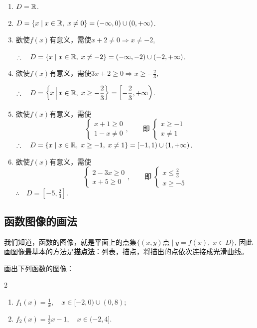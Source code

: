\begin{solution}    
\begin{enumerate}[(1)]
    \item $D=\mathbb{R}$.
    \item $D=\{x\mid x\in\mathbb{R},\; x\ne 0\}=(-\infty,0)\cup(0,+\infty)$.
    \item 欲使$f(x)$有意义，需使$x+2\ne 0\Longrightarrow x\ne -2$,
    
$\therefore\quad D=\{x\mid x\in\mathbb{R},\; x\ne -2\}=(-\infty,-2)\cup(-2,+\infty)$.

\item 欲使$f(x)$有意义，需使$3x+2\ge 0\Longrightarrow x\ge -\frac{2}{3}$,
    
$\therefore\quad D=\left\{x\, \Big|\, x\in\mathbb{R},\; x\ge -\dfrac{2}{3}\right\}=\left[-\dfrac{2}{3},+\infty\right)$.

\item 欲使$f(x)$有意义，需使
\[\begin{cases}
    x+1\ge 0\\
    1-x\ne 0
\end{cases},\qquad \text{即}\; \begin{cases}
    x\ge -1\\x\ne 1
\end{cases}\]
$\therefore\quad D=\{x\mid x\in\mathbb{R},\; x\ge -1,\; x\ne 1\}=[-1,1)\cup(1,+\infty)$.
\item 欲使$f(x)$有意义，需使
\[\begin{cases}
    2-3x\ge 0\\
    x+5\ge 0
\end{cases},\qquad \text{即}\; \begin{cases}
    x\le \frac{2}{3}\\x\ge -5
\end{cases}\]
$\therefore\quad D=\left[-5,\frac{2}{3}\right]$.
\end{enumerate}
\end{solution}    

\subsection{函数图像的画法}
我们知道，函数的图像，就是平面上的点集$\{(x,y) \text{点}\mid y=f(x),\; x\in D\}$, 因此画图像最基本的方法是\textbf{描点法}：列表，描点，将描出的点依次连接成光滑曲线。

\begin{example}
    画出下列函数的图像：
\begin{multicols}{2}
    \begin{enumerate}[(1)]
    \item $f_1(x)=\frac{1}{x},\quad x\in[-2,0)\cup (0,8)$;
    \item $f_2(x)=\frac{1}{2}x-1,\quad x\in (-2,4]$.
\end{enumerate}
\end{multicols}
\end{example}


